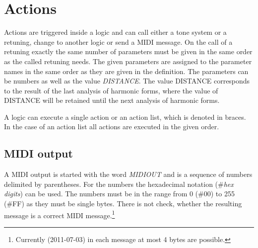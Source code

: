     

\section{Actions}\label{sec:aktionen}

Actions are triggered inside a logic and can call either a
tone system or a retuning, change to another logic or send a MIDI
message. On the call of a retuning exactly the same number of
parameters must be given in the same order as the
called retuning needs. The given parameters are assigned to the
parameter names in the same order as they are given in the
definition. The parameters can be numbers as well as the value
\textit{DISTANCE}. The value DISTANCE corresponds to
the result of the last analysis of harmonic forms, where the value of
DISTANCE will be retained until the next analysis of harmonic forms.

\iffalse
Aktionen werden innerhalb einer Logik ausgelöst und können wahlweise
ein Tonsystem aufrufen, eine Umstimmung aufrufen,
zu einer Logik wechseln oder eine MIDI-Nachricht
senden. Beim Aufruf einer Umstimmung müssen genau so viele Parameter\index{Parameter}
mitgegeben werden, wie die aufgerufene Umstimmung benötigt. Die mitgegebenen
Parameter werden in der gleichen Reihenfolge den Parameter-Namen
der Umstimmung zugeordnet. Als Parameter können Zahlen angegeben werden,
sowie der Wert {\it ABSTAND}\index{ABSTAND}.
Der Wert ABSTAND entspricht den Gegebenheiten der
zuletzt durchgeführten Harmonie-FORM-Analyse, wobei der Wert
ABSTAND bis zur nächsten Harmonie-FORM-Analyse beibehalten wird.
\fi

A logic can execute a single action or an action list, which is
denoted in braces. In the case of an action list all actions are
executed in the given order.

\iffalse
Eine Logik kann eine einzelne Aktion ausführen oder eine in geschweiften
Klammern stehende Aktions-Liste aus\-füh\-ren. Im Falle der Aktions-Liste
werden die einzelnen Aktionen der Liste in genau der angegebenen
Reihenfolge ausgeführt.
\fi

\subsection{MIDI output}\label{sec:midi-ausgaben}

A MIDI output is started with the word \textit{MIDIOUT}
and is a sequence of numbers delimited by parentheses. For the numbers
the hexadecimal notation (\#\textit{hex digits}) can be used. The
numbers must be in the range from 0 (\#00) to 255 (\#FF) as they must
be single bytes. There is not check, whether the resulting message is
a correct MIDI message.\footnote{Currently (2011-07-03) in each message at most 4 bytes are possible.}

